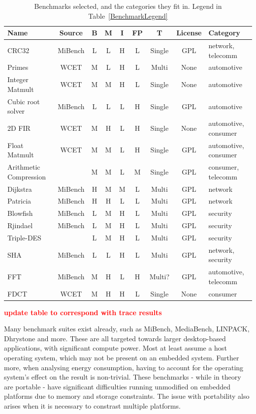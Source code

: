 \documentclass[twocolumn]{article}
\newcommand{\todo}[1]{\textbf{\textcolor{red}{#1}}}
\begin{document}
\begin{table}[th!]
\centering
	\begin{tabular}{l c c c c c c c l}
	Name				 	& Source 	& B & M & I & FP& T 		& License & Category \\
	\hline
	CRC32					& MiBench 	& L & L & H & L & Single 	& GPL	& network, telecomm	\\
	Primes					& WCET 		& M & L & H & L & Multi 	& None	& automotive	\\
	Integer Matmult			& WCET	 	& M & M & H & L & Single 	& None	& automotive	\\
	Cubic root solver		& MiBench 	& L & L & L & H & Single 	& GPL	& automotive	\\
	2D FIR					& WCET 		& M & H & L & H & Single 	& None	& automotive, consumer	\\
	Float Matmult			& WCET 		& M & M & L & H & Single 	& GPL	& automotive, consumer	\\
	Arithmetic Compression	&			& M & M & L & M & Single 	& GPL	& consumer, telecomm	\\
	Dijkstra				& MiBench 	& H & M & M & L & Multi 	& GPL	& network	\\
	Patricia				& MiBench 	& H & H & L & L & Multi 	& GPL	& network	\\
	Blowfish				& MiBench 	& L & M & H & L & Multi 	& GPL	& security	\\
	Rjindael				& MiBench 	& L & M & H & L & Multi 	& GPL	& security	\\
	Triple-DES				&		 	& L & M & H & L & Multi 	& GPL	& security	\\
	SHA						& MiBench 	& L & L & H & L & Multi 	& GPL	& network, security	\\
	FFT						& MiBench 	& M & H & L & H & Multi?	&  GPL	& automotive, telecomm	\\
	FDCT					& WCET 		& M & H & H & L & Single 	& None	& consumer	\\
	\end{tabular}
\caption{Benchmarks selected, and the categories they fit in. Legend in Table~\ref{BenchmarkLegend}}
\label{Table:BenchmarkTable}
\end{table}

\todo{update table to correspond with trace results}

Many benchmark suites exist already, such as MiBench\cite{Guthaus2001}, MediaBench\cite{Fritts2009}, LINPACK\cite{Dongarra2003}, Dhrystone\cite{Weicker1988} and more. These are all targeted towards larger desktop-based applications, with significant compute power. Most at least assume a host operating system, which may not be present on an embedded system. Further more, when analysing energy consumption, having to account for the operating system’s effect on the result is non-trivial. These benchmarks - while in theory are portable - have significant difficulties running unmodified on embedded platforms due to memory and storage constraints. The issue with portability also arises when it is necessary to constrast multiple platforms.
\end{document}
